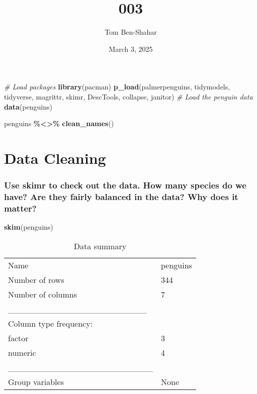 \documentclass[
]{article}
\title{003}
\author{Tom Ben-Shahar}
\date{March 3, 2025}
\newenvironment{Shaded}{\begin{snugshade}}{\end{snugshade}}
\newcommand{\CommentTok}[1]{\textcolor[rgb]{0.56,0.35,0.01}{\textit{#1}}}
\newcommand{\FunctionTok}[1]{\textcolor[rgb]{0.13,0.29,0.53}{\textbf{#1}}}
\newcommand{\NormalTok}[1]{#1}
\newcommand{\SpecialCharTok}[1]{\textcolor[rgb]{0.81,0.36,0.00}{\textbf{#1}}}
\newcommand{\StringTok}[1]{\textcolor[rgb]{0.31,0.60,0.02}{#1}}
\begin{document}
\maketitle

\begin{Shaded}
\begin{Highlighting}[]
\CommentTok{\# Load packages}
\FunctionTok{library}\NormalTok{(pacman)}
\FunctionTok{p\_load}\NormalTok{(palmerpenguins, tidymodels, tidyverse, magrittr, skimr, DescTools, collapse, janitor)}
\CommentTok{\# Load the penguin data}
\FunctionTok{data}\NormalTok{(}\StringTok{\textquotesingle{}penguins\textquotesingle{}}\NormalTok{)}

\NormalTok{penguins }\SpecialCharTok{\%\textless{}\textgreater{}\%} \FunctionTok{clean\_names}\NormalTok{()}
\end{Highlighting}
\end{Shaded}

\section{Data Cleaning}\label{data-cleaning}

\subsubsection{Use skimr to check out the data. How many species do we
have? Are they fairly balanced in the data? Why does it
matter?}\label{use-skimr-to-check-out-the-data.-how-many-species-do-we-have-are-they-fairly-balanced-in-the-data-why-does-it-matter}

\begin{Shaded}
\begin{Highlighting}[]
\FunctionTok{skim}\NormalTok{(penguins)}
\end{Highlighting}
\end{Shaded}

\begin{longtable}[]{@{}ll@{}}
\caption{Data summary}\tabularnewline
\toprule\noalign{}
\endfirsthead
\endhead
\bottomrule\noalign{}
\endlastfoot
Name & penguins \\
Number of rows & 344 \\
Number of columns & 7 \\
\_\_\_\_\_\_\_\_\_\_\_\_\_\_\_\_\_\_\_\_\_\_\_ & \\
Column type frequency: & \\
factor & 3 \\
numeric & 4 \\
\_\_\_\_\_\_\_\_\_\_\_\_\_\_\_\_\_\_\_\_\_\_\_\_ & \\
Group variables & None \\
\end{longtable}
\end{document}
